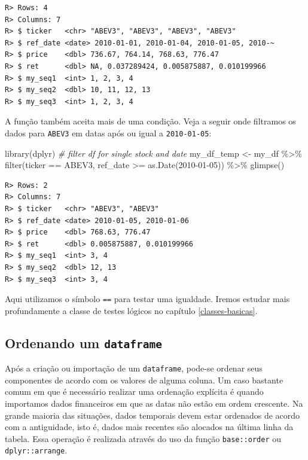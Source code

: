 \documentclass[
  11pt,
]{book}
\newenvironment{Shaded}{\begin{snugshade}}{\end{snugshade}}
\newcommand{\CommentTok}[1]{\textcolor[rgb]{0.37,0.37,0.37}{\textit{#1}}}
\newcommand{\FunctionTok}[1]{\textcolor[rgb]{0,0,0}{#1}}
\newcommand{\NormalTok}[1]{#1}
\newcommand{\OtherTok}[1]{\textcolor[rgb]{0.37,0.37,0.37}{#1}}
\newcommand{\SpecialCharTok}[1]{\textcolor[rgb]{0,0,0}{#1}}
\newcommand{\StringTok}[1]{\textcolor[rgb]{0.5,0.5,0.5}{#1}}
\begin{document}
\begin{verbatim}
R> Rows: 4
R> Columns: 7
R> $ ticker   <chr> "ABEV3", "ABEV3", "ABEV3", "ABEV3"
R> $ ref_date <date> 2010-01-01, 2010-01-04, 2010-01-05, 2010-~
R> $ price    <dbl> 736.67, 764.14, 768.63, 776.47
R> $ ret      <dbl> NA, 0.037289424, 0.005875887, 0.010199966
R> $ my_seq1  <int> 1, 2, 3, 4
R> $ my_seq2  <dbl> 10, 11, 12, 13
R> $ my_seq3  <int> 1, 2, 3, 4
\end{verbatim}

A função também aceita mais de uma condição. Veja a seguir onde filtramos os dados para \texttt{\textquotesingle{}ABEV3\textquotesingle{}} em datas após ou igual a \texttt{\textquotesingle{}2010-01-05\textquotesingle{}}:

\begin{Shaded}
\begin{Highlighting}[]
\FunctionTok{library}\NormalTok{(dplyr)}
\CommentTok{\# filter df for single stock and date}
\NormalTok{my\_df\_temp }\OtherTok{\textless{}{-}}\NormalTok{ my\_df }\SpecialCharTok{\%\textgreater{}\%}
  \FunctionTok{filter}\NormalTok{(ticker }\SpecialCharTok{==} \StringTok{\textquotesingle{}ABEV3\textquotesingle{}}\NormalTok{,}
\NormalTok{         ref\_date }\SpecialCharTok{\textgreater{}=} \FunctionTok{as.Date}\NormalTok{(}\StringTok{\textquotesingle{}2010{-}01{-}05\textquotesingle{}}\NormalTok{)) }\SpecialCharTok{\%\textgreater{}\%}
  \FunctionTok{glimpse}\NormalTok{()}
\end{Highlighting}
\end{Shaded}

\begin{verbatim}
R> Rows: 2
R> Columns: 7
R> $ ticker   <chr> "ABEV3", "ABEV3"
R> $ ref_date <date> 2010-01-05, 2010-01-06
R> $ price    <dbl> 768.63, 776.47
R> $ ret      <dbl> 0.005875887, 0.010199966
R> $ my_seq1  <int> 3, 4
R> $ my_seq2  <dbl> 12, 13
R> $ my_seq3  <int> 3, 4
\end{verbatim}

Aqui utilizamos o símbolo \texttt{==} para testar uma igualdade. Iremos estudar mais profundamente a classe de testes lógicos no capítulo \ref{classes-basicas}.

\hypertarget{ordenando-um-dataframe}{%
\subsection{\texorpdfstring{Ordenando um \texttt{dataframe}}{Ordenando um dataframe}}\label{ordenando-um-dataframe}}

Após a criação ou importação de um \texttt{dataframe}, pode-se ordenar seus componentes de acordo com os valores de alguma coluna. Um caso bastante comum em que é necessário realizar uma ordenação explícita é quando importamos dados financeiros em que as datas não estão em ordem crescente. Na grande maioria das situações, dados temporais devem estar ordenados de acordo com a antiguidade, isto é, dados mais recentes são alocados na última linha da tabela. Essa operação é realizada através do uso da função \texttt{base::order} ou \texttt{dplyr::arrange}.  
\end{document}
